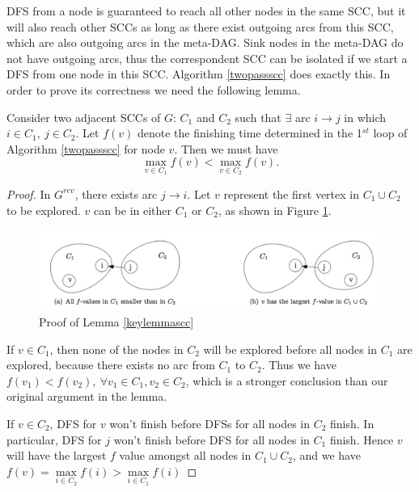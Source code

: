 DFS from a node is guaranteed to reach all other nodes in the same SCC, but it will also reach other SCCs as long as there exist outgoing arcs from this SCC, which are also outgoing arcs in the meta-DAG. Sink nodes in the meta-DAG do not have outgoing arcs, thus the correspondent SCC can be isolated if we start a DFS from one node in this SCC. Algorithm \ref{twopassscc} does exactly this. In order to prove its correctness we need the following lemma.
\begin{lemma}\label{keylemmascc}
Consider two adjacent SCCs of $G$: $C_1$ and $C_2$ such that $\exists$ arc $i\rightarrow j$ in which $i\in C_1,\:j\in C_2$. Let $f(v)$ denote the finishing time determined in the 1$^{st}$ loop of Algorithm \ref{twopassscc} for node $v$. Then we must have
$$\max\limits_{v\in C_1}f(v)<\max\limits_{v\in C_2}f(v).$$
\end{lemma}
\begin{proof}
In $G^{rev}$, there exists arc $j\rightarrow i$. Let $v$ represent the first vertex in $C_1\cup C_2$ to be explored. $v$ can be in either $C_1$ or $C_2$, as shown in Figure \ref{prooflemmascc}.
\begin{figure}[ht]
\centering
\includegraphics[width=\textwidth]{prooflemmascc.jpg}
\caption{Proof of Lemma \ref{keylemmascc}}\label{prooflemmascc}
\end{figure}

If $v\in C_1$, then none of the nodes in $C_2$ will be explored before all nodes in $C_1$ are explored, because there exists no arc from $C_1$ to $C_2$. Thus we have $f(v_1)<f(v_2),\:\forall v_1\in C_1, v_2\in C_2$, which is a stronger conclusion than our original argument in the lemma.

If $v\in C_2$, DFS for $v$ won't finish before DFSs for all nodes in $C_2$ finish. In particular, DFS for $j$ won't finish before DFS for all nodes in $C_1$ finish. Hence $v$ will have the largest $f$ value amongst all nodes in $C_1\cup C_2$, and we have $f(v)=\max\limits_{i\in C_2}f(i)>\max\limits_{i\in C_1}f(i)$ 
\end{proof}

